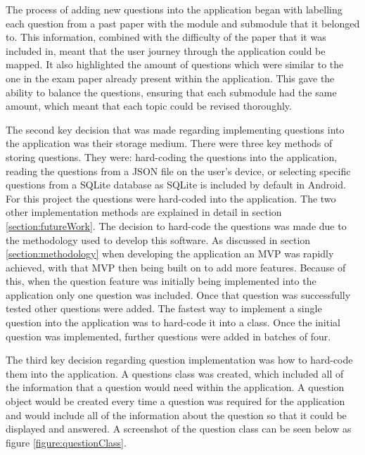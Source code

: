\documentclass{article}
\begin{document}
The process of adding new questions into the application began with labelling each question from a past paper with the module and submodule that it belonged to. This information, combined with the difficulty of the paper that it was included in, meant that the user journey through the application could be mapped. It also highlighted the amount of questions which were similar to the one in the exam paper already present within the application. This gave the ability to balance the questions, ensuring that each submodule had the same amount, which meant that each topic could be revised thoroughly. \par

The second key decision that was made regarding implementing questions into the application was their storage medium. There were three key methods of storing questions. They were: hard-coding the questions into the application, reading the questions from a JSON file on the user's device, or selecting specific questions from a SQLite database as SQLite is included by default in Android. For this project the questions were hard-coded into the application. The two other implementation methods are explained in detail in section \ref{section:futureWork}. The decision to hard-code the questions was made due to the methodology used to develop this software. As discussed in section \ref{section:methodology} when developing the application an MVP was rapidly achieved, with that MVP then being built on to add more features. Because of this, when the question feature was initially being implemented into the application only one question was included. Once that question was successfully tested other questions were added. The fastest way to implement a single question into the application was to hard-code it into a class. Once the initial question was implemented, further questions were added in batches of four. \par

The third key decision regarding question implementation was how to hard-code them into the application. A questions class was created, which included all of the information that a question would need within the application. A question object would be created every time a question was required for the application and would include all of the information about the question so that it could be displayed and answered. A screenshot of the question class can be seen below as figure \ref{figure:questionClass}. 
\end{document}
